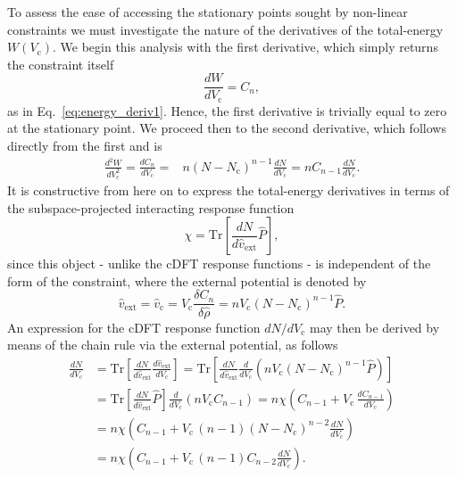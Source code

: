 {
To assess the ease of accessing the stationary points 
sought by non-linear constraints 
we must investigate the nature of 
the derivatives of the total-energy
$W\left( V_\textrm{c} \right)$.
%
We begin this analysis with the first derivative, 
which simply returns the constraint itself 
%
\begin{equation}
\frac{dW}{dV_\textrm{c}}=C_{n},
\end{equation}
%
as in Eq.~\eqref{eq:energy_deriv1}.
%
Hence, the first derivative is trivially equal to zero 
at the stationary point.}
%
We proceed then to the second derivative, 
which follows directly from the first and is 
%
\begin{align}
\frac{d^2W}{dV_\textrm{c}^2}= \frac{d C_n}{dV_\textrm{c}} ={}& 
 n\left(N-N_\textrm{c}\right)^{n-1}\frac{dN}{dV_\textrm{c}} 
 = nC_{n-1} \frac{dN}{dV_\textrm{c}}. 
\label{eq:energy_deriv2}
\end{align}
%
It is constructive from here on
to express the total-energy derivatives in terms of the 
subspace-projected interacting response function 
%
\begin{equation}
\chi = \mathrm{Tr} \left[  \frac{d N}{d \hat{v}_\textrm{ext}}  \hat{P} \right], 
\end{equation}
%
since this object 
- unlike the cDFT response functions - 
is independent of the form of the constraint, 
where the external potential is denoted by 
%
\begin{equation}
\hat{v}_\textrm{ext}
=\hat{v}_\textrm{c}
=V_\textrm{c}\frac{\delta C_n}{\delta\hat{\rho}}
=n  V_\textrm{c} \left( N - N_\textrm{c} \right)^{n-1} \hat{P}.
\end{equation}
%
An expression for the 
cDFT response function 
$dN / d V_\textrm{c}$
may then be derived 
by means of the chain rule via 
the external potential, as follows
%
\begin{align}
\frac{d N}{d V_\textrm{c}}
&=\mathrm{Tr} \left[ \frac{d N}{d \hat{v}_\textrm{ext} } 
\frac{d \hat{v}_\textrm{ext} }{d V_\textrm{c} } \right] =\mathrm{Tr} \left[ \frac{d N}{d \hat{v}_\textrm{ext} } 
\frac{d}{d V_\textrm{c} }\left(n  V_\textrm{c}\left( N - N_\textrm{c} \right)^{n-1} \hat{P}\right) \right] \nonumber  \\[1em]
&=\mathrm{Tr} \left[ \frac{d N}{d \hat{v}_\textrm{ext} }  \hat{P} \right]
\frac{d}{d V_\textrm{c} }\left(n  V_\textrm{c}C_{n-1}\right) 
=n \chi\left(C_{n-1}+V_\textrm{c}\,\frac{dC_{n-1}}{dV_\textrm{c}}\right) \nonumber  \\[1em]
&=n \chi\left(C_{n-1}+V_\textrm{c}\,(n-1)(N-N_\textrm{c})^{n-2}\frac{dN}{dV_\textrm{c}}\right) \nonumber   \\[1em]
&=n \chi\left(C_{n-1}+V_\textrm{c}\,(n-1)C_{n-2}\frac{dN}{dV_\textrm{c}}\right).
\label{eq:first_order_resp_derivation}
\end{align} 
